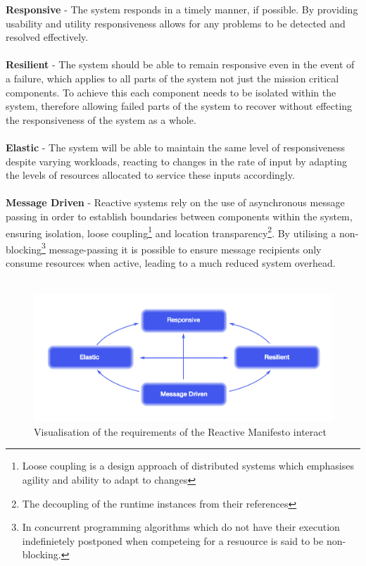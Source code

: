 \documentclass[a4paper, 11pt]{article}
\begin{document}
\textbf{Responsive} - The system responds in a timely manner, if possible. By providing usability and utility responsiveness allows for any problems to be detected and resolved effectively.\\\\
\textbf{Resilient} - The system should be able to remain responsive even in the event of a failure, which applies to all parts of the system not just the mission critical components. To achieve this each component needs to be isolated within the system, therefore allowing failed parts of the system to recover without effecting the responsiveness of the system as a whole.\\\\
\textbf{Elastic} - The system will be able to maintain the same level of responsiveness despite varying workloads, reacting to changes in the rate of input by adapting the levels of resources allocated to service these inputs accordingly.\\\\
\textbf{Message Driven} - Reactive systems rely on the use of asynchronous message passing in order to establish boundaries between components within the system, ensuring isolation, loose coupling\footnote{Loose coupling is a design approach of distributed systems which emphasises agility and ability to adapt to changes\cite{looseCouple}} and location transparency\footnote{The decoupling of the runtime instances from their references\cite{reactMan}}. By utilising a non-blocking\footnote{In concurrent programming algorithms which do not have their execution indefinietely postponed when competeing for a resuource is said to be non-blocking\cite{reactMan}.} message-passing it is possible to ensure message recipients only consume resources when active, leading to a much reduced system overhead.\\\\

\begin{figure}[ht]
	\centering
	\includegraphics[scale=0.25]{images/reacManif.jpg}
	\caption{Visualisation of the requirements of the Reactive Manifesto interact\cite{reactMan}}
	\label{fig: reacMan}
\end{figure}
\end{document}
